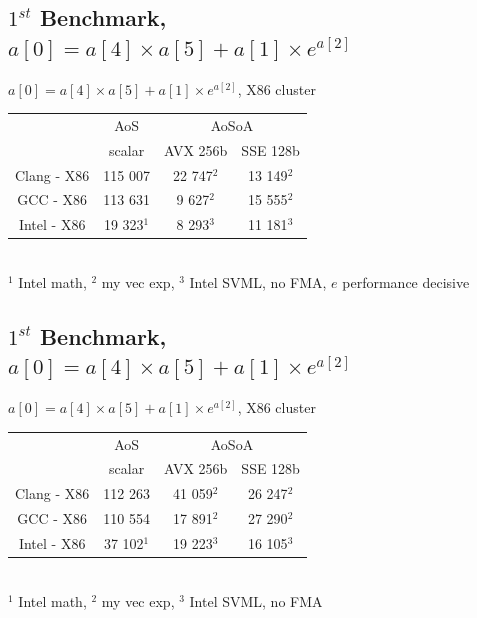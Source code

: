 \documentclass{beamer}
\begin{document}
\subsection*{$1^{st}$ Benchmark, $a[0] = a[4] \times a[5] + a[1] \times e^{a[2]}$}
\begin{frame}[fragile]
\begin{center}
$a[0] = a[4] \times a[5] + a[1] \times e^{a[2]}$, X86 cluster
\end{center}
\begin{tabular}{ c |  c  | c c }
\color{C0}{float}       & AoS & \multicolumn{2}{c}{AoSoA}\\
                        & scalar & AVX 256b & SSE 128b\\
                        \hline
   Clang - X86 & 115 007  & 22 747$^2$ & \cellcolor{C2}13 149$^2$\\
   GCC - X86  & 113 631   & \cellcolor{C2}9 627$^2$ & 15 555$^2$ \\
   Intel - X86   & 19 323$^1$   & \cellcolor{C2}8 293$^3$ & 11 181$^3$\\
   \hline
\end{tabular}\\
\vspace{0.5cm}
$^1$ Intel math, $^2$ my vec exp,  $^3$ Intel SVML, no FMA, $e$ performance decisive 
\end{frame}


\subsection*{$1^{st}$ Benchmark, $a[0] = a[4] \times a[5] + a[1] \times e^{a[2]}$}
\begin{frame}[fragile]
\begin{center}
$a[0] = a[4] \times a[5] + a[1] \times e^{a[2]}$, X86 cluster
\end{center}
\begin{tabular}{ c |  c  | c c }
\color{C0}{double}           & AoS & \multicolumn{2}{c}{AoSoA}\\
                        & scalar & AVX 256b & SSE 128b\\
   \hline
   Clang - X86 & 112 263 & 41 059$^2$ & \cellcolor{C2}26 247$^2$\\
   GCC - X86  & 110 554   & \cellcolor{C2}17 891$^2$ & 27 290$^2$ \\
   Intel - X86   & 37 102$^1$ & 19 223$^3$ & \cellcolor{C2}16 105$^3$\\
   \hline
\end{tabular}\\
\vspace{0.5cm}
$^1$ Intel math, $^2$ my vec exp, $^3$ Intel SVML, no FMA
\end{frame}
\end{document}
